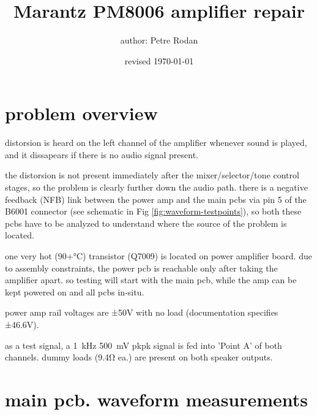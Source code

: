 \documentclass[a4paper,twoside,notitlepage]{article}
\makeatletter
\newcommand*{\toccontents}{\@starttoc{toc}}
\makeatother
\begin{document}
\title{\textbf{Marantz PM8006} amplifier repair}
\author{author: Petre Rodan}
\date{revised \today}
\maketitle

%


\toccontents

\section{problem overview} \label{sec:problem-overview}

distorsion is heard on the left channel of the amplifier whenever sound is played, and it dissapears if there is no audio signal present.

the distorsion is not present immediately after the mixer/selector/tone control stages, so the problem is clearly further down the audio path. there is a negative feedback (NFB) link between the power amp and the main pcbs via pin 5 of the B6001 connector (see schematic in Fig \ref{fig:waveform-testpoints}), so both these pcbs have to be analyzed to understand where the source of the problem is located.

one very hot (90+\si{\celsius}) transistor (Q7009) is located on power amplifier board. due to assembly constraints, the power pcb is reachable only after taking the amplifier apart. so testing will start with the main pcb, while the amp can be kept powered on and all pcbs in-situ.

power amp rail voltages are ±50V with no load (documentation specifies ±46.6V).

as a test signal, a \SI{1}{\kilo\hertz} \SI{500}{\milli\volt} pkpk signal is fed into 'Point A' of both channels. dummy loads (9.4\si{\ohm} ea.) are present on both speaker outputs.

\clearpage
\section{main pcb. waveform measurements} \label{sec:waveform-measurements}
\end{document}
